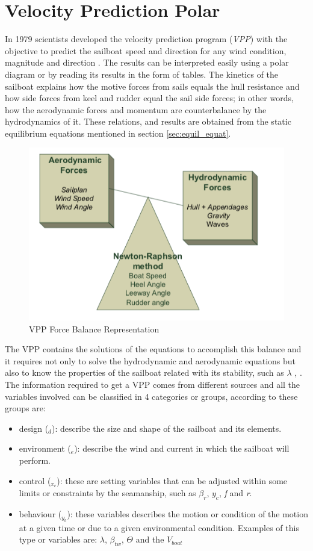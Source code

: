 \section{Velocity Prediction Polar} \label{sec:VPP}
In 1979 scientists developed the velocity prediction  program (\textit{VPP}) with the objective to predict the sailboat speed and direction for any wind condition, magnitude and direction \cite{larsonprinciples}. The results can be interpreted easily using a polar diagram or by reading its results in the form of tables.  The kinetics of the sailboat explains how the motive forces from sails equals the hull resistance and how side forces from keel and rudder equal the sail side forces; in other words, how the aerodynamic forces and momentum are counterbalance by the hydrodynamics of it. These relations, and results are obtained from the static equilibrium equations mentioned in section \ref{sec:equil_equat}.\par 
\begin{figure}
    \centering
    \includegraphics[width=0.5\hsize]{images/Vpp_balance_eq.png}
    \caption{VPP Force Balance Representation \cite{bohm2014velocity} }
    \label{fig:my_label}
\end{figure}
The VPP contains the solutions of the equations to accomplish this balance and it requires not only to solve the hydrodynamic and aerodynamic equations but also to know the properties of the sailboat related with its stability, such as $\lambda$ \cite{larsonprinciples}, \cite{milgram1998fluid}. The information required to get a VPP comes from different sources and all the variables involved can be classified in 4 categories or groups, according to \cite{philpott1993yacht} these groups are:
\begin{itemize}
    \item design (\textit{$_{d}$}): describe the size and shape of the sailboat and its elements.
    \item environment (\textit{$_{e}$}): describe the wind and current in which the sailboat will perform.
    \item control (\textit{$_{x_{c}}$}): these are setting variables that can be adjusted within some limits or constraints by the seamanship, such as $\beta_{r}$, $y_{c}$, \textit{f} and \textit{r}.
    \item behaviour (\textit{$_{y_{b}}$}): these variables describes the motion or condition of the motion at a given time or due to a given environmental condition. Examples of this type or variables are: $\lambda$, $\beta_{tw}$, $\Theta$ and the $V_{boat}$
\end{itemize}
